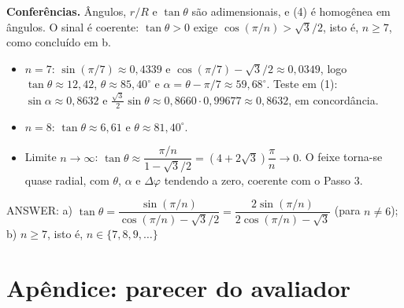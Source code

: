 \documentclass{article}%
\begin{document}
\textbf{Conferências.} Ângulos, $r/R$ e $\tan\theta$ são adimensionais, e (4) é homogênea em ângulos. O sinal é coerente: $\tan\theta>0$ exige $\cos(\pi/n)>\sqrt3/2$, isto é, $n\ge 7$, como concluído em b.
\begin{itemize}
\item $n=7$: $\sin(\pi/7)\approx 0{,}4339$ e $\cos(\pi/7)-\sqrt3/2\approx 0{,}0349$, logo $\tan\theta\approx 12{,}42$, $\theta\approx 85{,}40^\circ$ e $\alpha=\theta-\pi/7\approx 59{,}68^\circ$. Teste em (1): $\sin\alpha\approx 0{,}8632$ e $\frac{\sqrt3}{2}\sin\theta\approx 0{,}8660\cdot 0{,}99677\approx 0{,}8632$, em concordância.
\item $n=8$: $\tan\theta\approx 6{,}61$ e $\theta\approx 81{,}40^\circ$.
\item Limite $n\to\infty$: $\tan\theta\approx\dfrac{\pi/n}{1-\sqrt3/2}=(4+2\sqrt3)\dfrac{\pi}{n}\to 0$. O feixe torna-se quase radial, com $\theta$, $\alpha$ e $\Delta\varphi$ tendendo a zero, coerente com o Passo 3.
\end{itemize}

ANSWER: a) $\tan\theta=\dfrac{\sin(\pi/n)}{\cos(\pi/n)-\sqrt{3}/2}=\dfrac{2\sin(\pi/n)}{2\cos(\pi/n)-\sqrt{3}}$ (para $n\neq 6$); b) $n\geq 7$, isto é, $n\in\{7,8,9,\dots\}$%
\newpage%
\section*{Apêndice: parecer do avaliador}%
\end{document}

